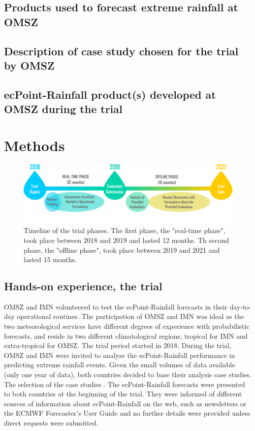 \documentclass[twocol]{ametsocV5} %
\begin{document}
\subsection{Products used to forecast extreme rainfall at OMSZ}

\subsection{Description of case study chosen for the trial by OMSZ}

\subsection{ecPoint-Rainfall product(s) developed at OMSZ during the trial}



\section{Methods} 


\begin{figure}
\centerline{\includegraphics[width=39pc]{manuscript/Figures/Fig3.png}}
\caption{Timeline of the trial phases. The first phase, the "real-time phase", took place between 2018 and 2019 and lasted 12 months. Th second phase, the "offline phase", took place between 2019 and 2021 and lasted 15 months.}
\label{Fig3}
\end{figure}


\subsection{Hands-on experience, the trial}
 OMSZ and IMN volunteered to test the ecPoint-Rainfall forecasts in their day-to-day operational routines. The participation of OMSZ and IMN was ideal as the two meteorological services have different degrees of experience with probabilistic forecasts, and reside in two different climatological regions; tropical for IMN and extra-tropical for OMSZ. The trial period started in 2018. During the trial, OMSZ and IMN were invited to analyse the ecPoint-Rainfall performance in predicting extreme rainfall events. Given the small volumes of data available (only one year of data), both countries decided to base their analysis case studies. The selection of the case studies . The ecPoint-Rainfall forecasts were presented to both countries at the beginning of the trial. They were informed of different sources of information about ecPoint-Rainfall on the web, such as newsletters or the ECMWF Forecaster's User Guide \citep{Owens2018} and no further details were provided unless direct requests were submitted.
	
\end{document}
